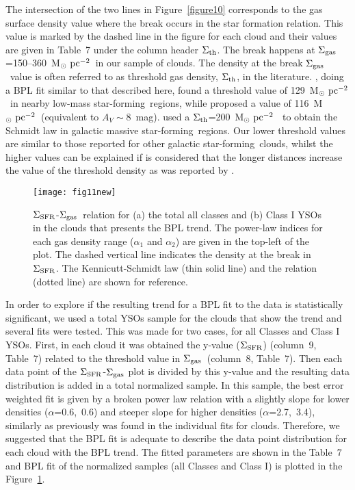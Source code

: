 \documentclass[iop]{emulateapj}
\newcommand{\starf}{star-forming}
\newcommand{\msunpc}{M$_{\odot}~{\rm pc}^{-2}$}
\newcommand{\sigsfr}{$\Sigma_{\rm SFR}$}
\newcommand{\siggas}{$\Sigma_{\rm gas}$}
\newcommand{\sigth}{$\Sigma_{\rm th}$}
\begin{document}
The intersection of the two lines in Figure~\ref{figure10} corresponds to 
the gas surface density value where the break occurs in the star formation 
relation. This value is marked by the dashed line in the figure for each cloud 
and their values are given in Table~7 under the column header \sigth.
The break happens at \siggas=150--360~\msunpc\ in our sample of clouds. 
The density at the break \siggas\ value is often referred to as threshold gas 
density, \sigth, in the literature. 
\citet{heiderman+10}, doing a BPL fit similar to that described here, found
a threshold value of 129~\msunpc\ in nearby low-mass \starf~regions, while 
\citet{lada+10} proposed a value of 116~\msunpc~(equivalent to 
$A_V\sim$8~mag). \citet{willis+15} used a \sigth=200~\msunpc~ to obtain 
the Schmidt law in galactic massive \starf~regions. 
Our lower threshold values are similar to those reported for other 
galactic \starf~clouds, whilst the higher values can be explained if is 
considered that the longer distances increase the value of the threshold 
density as was reported by \citet{heiderman+10}.


\begin{figure}[!ht]
     \begin{center}
            \texttt{[image: fig11new]}
    \end{center}
\caption{
\sigsfr-\siggas~relation for (a) the total all classes and (b) Class I YSOs 
in the clouds that presents the BPL trend.
The power-law indices for each gas density range ($\alpha_{1}$ and $\alpha_{2}$) 
are given in the top-left of the plot. The dashed vertical line indicates the density 
at the break in \sigsfr. The Kennicutt-Schmidt law (thin solid line) 
and the \citet{wu+05} relation (dotted line) are shown for reference.
}
   \label{figure11}
\end{figure}

In order to explore if the resulting trend for a BPL fit to the data is 
statistically significant, we used a total YSOs sample for the clouds that 
show the trend and several fits were tested. This was made for two cases, 
for all Classes and Class I YSOs. First, in each cloud it was obtained the 
y-value (\sigsfr) (column~9, Table~7) related to the threshold value in 
\siggas\ (column~8, Table~7). Then each data point of the \sigsfr-\siggas 
plot is divided by this y-value and the resulting data distribution is added 
in a total normalized sample.  In this sample, the best error weighted fit 
is given by a broken power law relation with a slightly slope for lower 
densities ($\alpha$=0.6,~0.6) and steeper slope for higher densities 
($\alpha$=2.7,~3.4), similarly as previously was found in the individual 
fits for clouds. Therefore, we suggested that the BPL fit 
is adequate to describe the data point distribution for each cloud with the 
BPL trend.  The fitted parameters are shown in the Table~7 and BPL fit 
of the normalized samples (all Classes and Class I) is plotted in the 
Figure~\ref{figure11}. 
\end{document}
